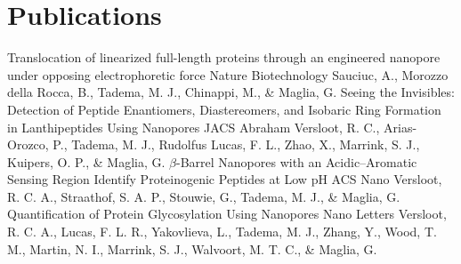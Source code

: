 \documentclass[letterpaper]{twentysecondcv} %
\begin{document}

\section{Publications}


\begin{twenty}
		{Translocation of linearized full-length proteins through an engineered nanopore under opposing electrophoretic force}
		{Nature Biotechnology}
		{Sauciuc, A., Morozzo della Rocca, B., Tadema, M. J., Chinappi, M., \& Maglia, G.} 
		{Seeing the Invisibles: Detection of Peptide Enantiomers, Diastereomers, and Isobaric Ring Formation in Lanthipeptides Using Nanopores}
		{JACS}
		{Abraham Versloot, R. C., Arias-Orozco, P., Tadema, M. J., Rudolfus Lucas, F. L., Zhao, X., Marrink, S. J., Kuipers, O. P., \& Maglia, G.}
		{$\beta$-Barrel Nanopores with an Acidic–Aromatic Sensing Region Identify Proteinogenic Peptides at Low pH}
		{ACS Nano}
		{Versloot, R. C. A., Straathof, S. A. P., Stouwie, G., Tadema, M. J., \& Maglia, G.}
		{Quantification of Protein Glycosylation Using Nanopores}
		{Nano Letters}
		{Versloot, R. C. A., Lucas, F. L. R., Yakovlieva, L., Tadema, M. J., Zhang, Y., Wood, T. M., Martin, N. I., Marrink, S. J., Walvoort, M. T. C., \& Maglia, G.}
\end{twenty}



%
\end{document}
